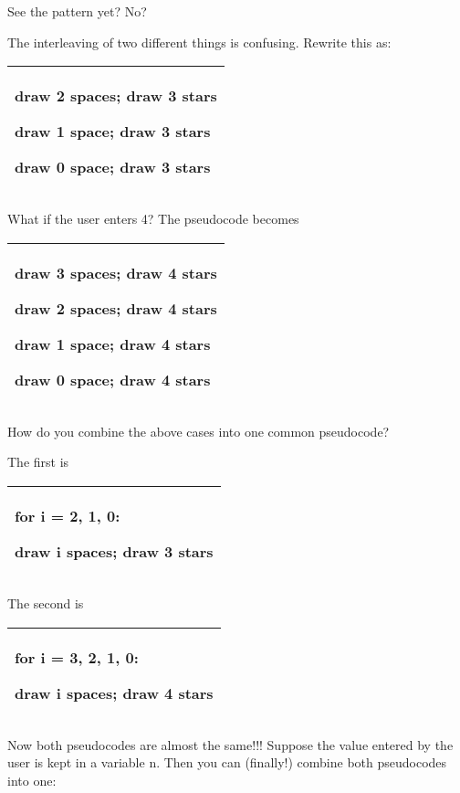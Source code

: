 \documentclass[
]{article}
\begin{document}
See the pattern yet? No?

The interleaving of two different things is confusing. Rewrite this as:

\begin{longtable}[]{@{}l@{}}
\toprule
\endhead
\begin{minipage}[t]{0.97\columnwidth}\raggedright
draw 2 spaces; draw 3 stars

draw 1 space; draw 3 stars

draw 0 space; draw 3 stars\strut
\end{minipage}\tabularnewline
\bottomrule
\end{longtable}

What if the user enters 4? The pseudocode becomes

\begin{longtable}[]{@{}l@{}}
\toprule
\endhead
\begin{minipage}[t]{0.97\columnwidth}\raggedright
draw 3 spaces; draw 4 stars

draw 2 spaces; draw 4 stars

draw 1 space; draw 4 stars

draw 0 space; draw 4 stars\strut
\end{minipage}\tabularnewline
\bottomrule
\end{longtable}

How do you combine the above cases into one common pseudocode?

The first is

\begin{longtable}[]{@{}l@{}}
\toprule
\endhead
\begin{minipage}[t]{0.97\columnwidth}\raggedright
for i = 2, 1, 0:

draw i spaces; draw 3 stars\strut
\end{minipage}\tabularnewline
\bottomrule
\end{longtable}

The second is

\begin{longtable}[]{@{}l@{}}
\toprule
\endhead
\begin{minipage}[t]{0.97\columnwidth}\raggedright
for i = 3, 2, 1, 0:

draw i spaces; draw 4 stars\strut
\end{minipage}\tabularnewline
\bottomrule
\end{longtable}

Now both pseudocodes are almost the same!!! Suppose the value entered by
the user is kept in a variable n. Then you can (finally!) combine both
pseudocodes into one:
\end{document}
